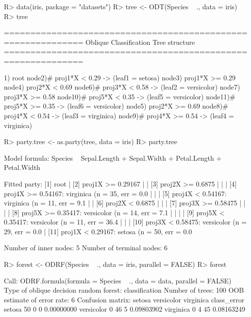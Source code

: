 \documentclass[nojss]{jss}
\numberwithin{equation}{section}
\begin{document}
\begin{Schunk}
\begin{Sinput}
R> data(iris, package = "datasets")
R> tree <- ODT(Species ~ ., data = iris)
R> tree
\end{Sinput}
\begin{Soutput}
============================================================= 
Oblique Classification Tree structure 
=============================================================

1) root
   node2)# proj1*X < 0.29 -> (leaf1 = setosa)
   node3)  proj1*X >= 0.29
      node4)  proj2*X < 0.69
         node6)# proj3*X < 0.58 -> (leaf2 = versicolor)
         node7)  proj3*X >= 0.58
            node10)# proj5*X < 0.35 -> (leaf5 = versicolor)
            node11)# proj5*X >= 0.35 -> (leaf6 = versicolor)
      node5)  proj2*X >= 0.69
         node8)# proj4*X < 0.54 -> (leaf3 = virginica)
         node9)# proj4*X >= 0.54 -> (leaf4 = virginica)
\end{Soutput}
\begin{Sinput}
R> party.tree <- as.party(tree, data = iris)
R> party.tree
\end{Sinput}
\begin{Soutput}
Model formula:
Species ~ Sepal.Length + Sepal.Width + Petal.Length + Petal.Width

Fitted party:
[1] root
|   [2] proj1X >= 0.29167
|   |   [3] proj2X >= 0.6875
|   |   |   [4] proj4X >= 0.54167: virginica (n = 35, err = 0.0%
|   |   |   [5] proj4X < 0.54167: virginica (n = 11, err = 9.1%
|   |   [6] proj2X < 0.6875
|   |   |   [7] proj3X >= 0.58475
|   |   |   |   [8] proj5X >= 0.35417: versicolor (n = 14, err = 7.1%
|   |   |   |   [9] proj5X < 0.35417: versicolor (n = 11, err = 36.4%
|   |   |   [10] proj3X < 0.58475: versicolor (n = 29, err = 0.0%
|   [11] proj1X < 0.29167: setosa (n = 50, err = 0.0%

Number of inner nodes:    5
Number of terminal nodes: 6
\end{Soutput}
\begin{Sinput}
R> forest <- ODRF(Species ~ ., data = iris, parallel = FALSE)
R> forest
\end{Sinput}
\begin{Soutput}
Call:
 ODRF.formula(formula = Species ~ ., data = data, parallel = FALSE) 
               Type of oblique decision random forest: classification
                                      Number of trees: 100
                           OOB estimate of error rate: 6%
Confusion matrix:
           setosa versicolor virginica class_error
setosa         50          0         0  0.00000000
versicolor      0         46         5  0.09803902
virginica       0          4        45  0.08163249
\end{Soutput}
\end{Schunk}
\end{document}
